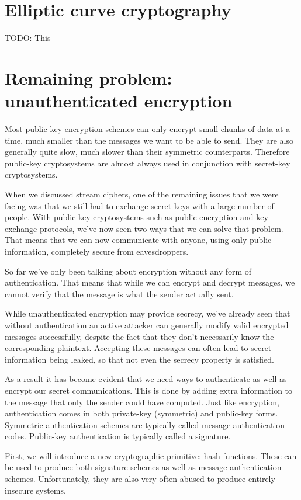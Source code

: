 \documentclass[11pt,ebook,table,dvipsnames]{memoir}
\begin{document}
\section{Elliptic curve cryptography}
\label{sec-2-5-4}

TODO: This
\section{Remaining problem: unauthenticated encryption}
\label{sec-2-5-5}

Most \gls{public-key encryption} schemes can only encrypt small chunks
of data at a time, much smaller than the messages we want to be able
to send. They are also generally quite slow, much slower than their
symmetric counterparts. Therefore public-key cryptosystems are almost
always used in conjunction with secret-key cryptosystems.

When we discussed stream ciphers, one of the remaining issues that we
were facing was that we still had to exchange secret keys with a large
number of people. With public-key cryptosystems such as public
encryption and key exchange protocols, we've now seen two ways that we
can solve that problem. That means that we can now communicate with
anyone, using only public information, completely secure from
eavesdroppers.

So far we've only been talking about encryption without any form of
authentication. That means that while we can encrypt and decrypt
messages, we cannot verify that the message is what the sender
actually sent.

While unauthenticated encryption may provide secrecy, we've already
seen that without authentication an active attacker can generally
modify valid encrypted messages successfully, despite the fact that
they don't necessarily know the corresponding plaintext. Accepting
these messages can often lead to secret information being leaked, so
that not even the secrecy property is satisfied.

As a result it has become evident that we need ways to authenticate as
well as encrypt our secret communications. This is done by adding
extra information to the message that only the sender could have
computed. Just like encryption, authentication comes in both
private-key (symmetric) and public-key forms. Symmetric authentication
schemes are typically called message authentication codes. Public-key
authentication is typically called a signature.

First, we will introduce a new cryptographic primitive: hash
functions. These can be used to produce both signature schemes as well
as message authentication schemes. Unfortunately, they are also very
often abused to produce entirely insecure systems.
\end{document}
